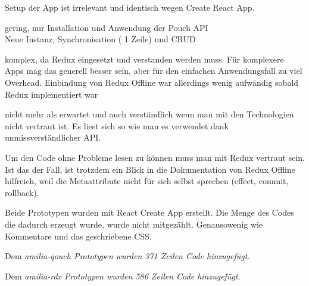 %
Setup der \gls{App} ist irrelevant und identisch wegen Create React App.
%
%
\begin{description}[leftmargin=0.5cm,style=nextline]
  \item[amilia-qouch]
  gering, nur Installation und Anwendung der Pouch API\\
  Neue Instanz, Synchronisation ( 1 Zeile) und CRUD
  \item[amilia-rdx]
  komplex, da Redux eingesetzt und verstanden werden muss. Für komplexere Apps mag das generell besser sein, aber für den einfachen Anwendungsfall zu viel Overhead. Einbindung von Redux Offline war allerdings wenig aufwändig sobald Redux implementiert war
\end{description}
%
\begin{description}[leftmargin=0.5cm,style=nextline]
  \item[amilia-qouch]
  nicht mehr als erwartet und auch verständlich wenn man mit den Technologien nicht vertraut ist. Es liest sich so wie man es verwendet dank unmissverständlicher API.
  \item[amilia-rdx] 
  Um den Code ohne Probleme lesen zu können muss man mit Redux vertraut sein. Ist das der Fall, ist trotzdem ein Blick in die Dokumentation von Redux Offline hilfreich, weil die Metaattribute nicht für sich selbst sprechen (effect, commit, rollback).
\end{description}
%
  Beide Prototypen wurden mit React Create App erstellt. Die Menge des Codes die dadurch erzeugt wurde, wurde nicht mitgezählt. Genausowenig wie Kommentare und das geschriebene \gls{CSS}.
  \begin{description}[leftmargin=0.5cm,style=nextline]
    \item[amilia-qouch]
    Dem \it{amilia-qouch} Prototypen wurden 371 Zeilen Code hinzugefügt.
    \item[amilia-rdx] 
    Dem \it{amilia-rdx} Prototypen wurden 586 Zeilen Code hinzugefügt.
\end{description}

